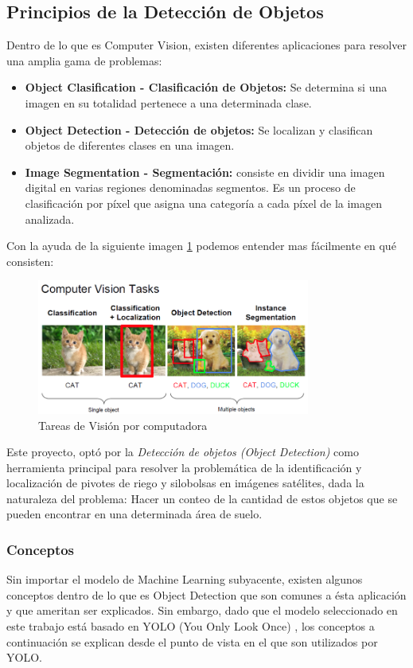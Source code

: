 \label{Principios de la Deteccion de Objetos}
\subsection{Principios de la Detección de Objetos}
Dentro de lo que es Computer Vision, existen diferentes aplicaciones para resolver una amplia gama de problemas:
\begin{itemize}
    \item \textbf{Object Clasification - Clasificación de Objetos:} Se determina si una imagen en su totalidad pertenece a una determinada clase.
    \item \textbf{Object Detection - Detección de objetos:} Se localizan y clasifican objetos de diferentes clases en una imagen. 
    \item \textbf{Image Segmentation - Segmentación:} consiste en dividir una imagen digital en varias regiones denominadas segmentos. Es un proceso de clasificación por píxel que asigna una categoría a cada píxel de la imagen analizada.
\end{itemize}

Con la ayuda de la siguiente imagen \ref{fig:computer vision} podemos entender mas fácilmente en qué consisten:

\begin{figure}[h!]
    \centering
    \includegraphics[width=0.8\textwidth]{img/computerVision.png}
    \caption{Tareas de Visión por computadora \cite{taskcompvision}}
    \label{fig:computer vision}
\end{figure}

\newpage
Este proyecto, optó por la \textit{Detección de objetos (Object Detection)} como herramienta principal para resolver la problemática de la identificación y localización de pivotes de riego y silobolsas en imágenes satélites, dada la naturaleza del problema: Hacer un conteo de la cantidad de estos objetos que se pueden encontrar en una determinada área de suelo.

\subsubsection{Conceptos}
Sin importar el modelo de Machine Learning subyacente, existen algunos conceptos dentro de lo que es Object Detection que son comunes a ésta aplicación y que ameritan ser explicados. Sin embargo, dado que el modelo seleccionado en este trabajo está basado en YOLO (You Only Look Once) \cite{yolo}, los conceptos a continuación se explican desde el punto de vista en el que son utilizados por YOLO.

